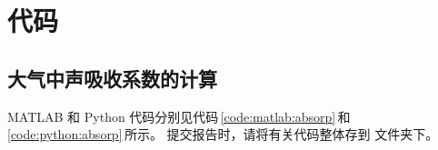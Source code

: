 \chapter{代码}

\zhlipsum[2-3]
\section{大气中声吸收系数的计算}
MATLAB 和 Python 代码分别见代码\,\ref{code:matlab:absorp}\,和\,\ref{code:python:absorp}\,所示。
提交报告时，请将有关代码整体存到  文件夹下。



